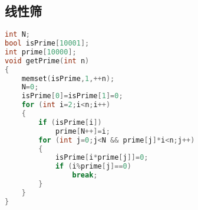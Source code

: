 \subsection{线性筛}
    \begin{lstlisting}[language=c++]
int N;
bool isPrime[10001];
int prime[10000];
void getPrime(int n)
{
    memset(isPrime,1,++n);
    N=0;
    isPrime[0]=isPrime[1]=0;
    for (int i=2;i<n;i++)
    {
        if (isPrime[i])
            prime[N++]=i;
        for (int j=0;j<N && prime[j]*i<n;j++)
        {
            isPrime[i*prime[j]]=0;
            if (i%prime[j]==0)
                break;
        }
    }
}
    \end{lstlisting}
